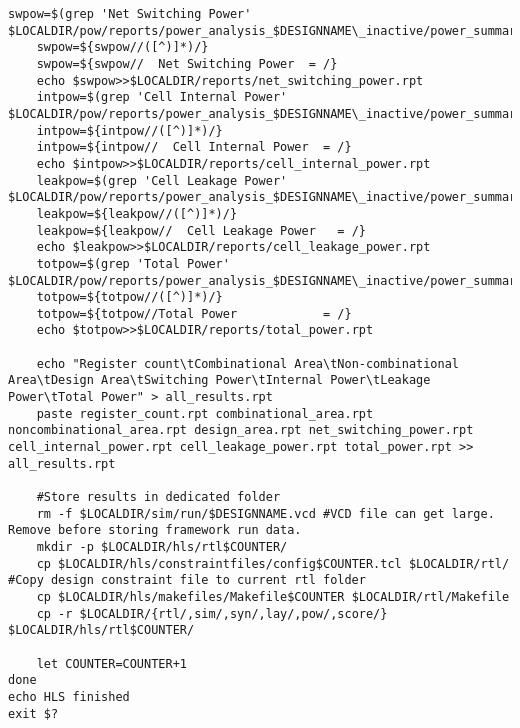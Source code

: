 \begin{lstlisting}[caption={HLS Script source code},label=lst:hlsscriptsourcecode]
	swpow=$(grep 'Net Switching Power' $LOCALDIR/pow/reports/power_analysis_$DESIGNNAME\_inactive/power_summary.rpt)
	swpow=${swpow//([^)]*)/}
	swpow=${swpow//  Net Switching Power  = /}
	echo $swpow>>$LOCALDIR/reports/net_switching_power.rpt
	intpow=$(grep 'Cell Internal Power' $LOCALDIR/pow/reports/power_analysis_$DESIGNNAME\_inactive/power_summary.rpt)
	intpow=${intpow//([^)]*)/}
	intpow=${intpow//  Cell Internal Power  = /}
	echo $intpow>>$LOCALDIR/reports/cell_internal_power.rpt
	leakpow=$(grep 'Cell Leakage Power' $LOCALDIR/pow/reports/power_analysis_$DESIGNNAME\_inactive/power_summary.rpt)
	leakpow=${leakpow//([^)]*)/}
	leakpow=${leakpow//  Cell Leakage Power   = /}
	echo $leakpow>>$LOCALDIR/reports/cell_leakage_power.rpt
	totpow=$(grep 'Total Power' $LOCALDIR/pow/reports/power_analysis_$DESIGNNAME\_inactive/power_summary.rpt)
	totpow=${totpow//([^)]*)/}
	totpow=${totpow//Total Power            = /}
	echo $totpow>>$LOCALDIR/reports/total_power.rpt
		
	echo "Register count\tCombinational Area\tNon-combinational Area\tDesign Area\tSwitching Power\tInternal Power\tLeakage Power\tTotal Power" > all_results.rpt
	paste register_count.rpt combinational_area.rpt noncombinational_area.rpt design_area.rpt net_switching_power.rpt cell_internal_power.rpt cell_leakage_power.rpt total_power.rpt >> all_results.rpt
	
	#Store results in dedicated folder
	rm -f $LOCALDIR/sim/run/$DESIGNNAME.vcd #VCD file can get large. Remove before storing framework run data.
	mkdir -p $LOCALDIR/hls/rtl$COUNTER/
	cp $LOCALDIR/hls/constraintfiles/config$COUNTER.tcl $LOCALDIR/rtl/ #Copy design constraint file to current rtl folder
	cp $LOCALDIR/hls/makefiles/Makefile$COUNTER $LOCALDIR/rtl/Makefile
	cp -r $LOCALDIR/{rtl/,sim/,syn/,lay/,pow/,score/} $LOCALDIR/hls/rtl$COUNTER/
	
	let COUNTER=COUNTER+1 
done
echo HLS finished
exit $?
\end{lstlisting}
\clearpage

